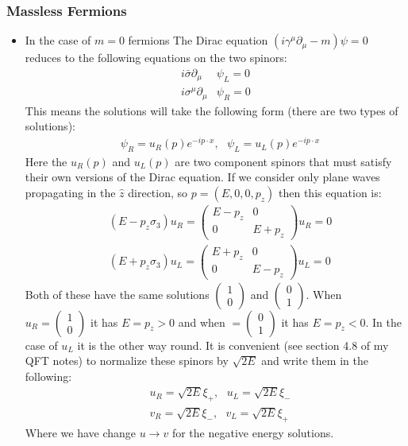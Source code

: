\documentclass[11pt]{article}
\numberwithin{equation}{section}
\begin{document}
\subsubsection{Massless Fermions} %
\label{ssub:massless_fermions}
\begin{itemize}
    \item In the case of $m=0$ fermions The Dirac equation $(i\gamma^{\mu}\partial_{\mu}-m)\psi = 0$ reduces to the following equations on the two spinors:
    \begin{align*}
         i\bar{\sigma}\partial_{\mu}&\psi_{L} = 0 \\
      i\sigma^{\mu}\partial_{\mu}& \psi_{R} =0 
    \end{align*}
    This means the solutions will take the following form (there are two types of solutions):
    \begin{align}
    \label{spinor_ansatz}
        &\psi_{R} = u_{R}(p)e^{-ip \cdot x}, ~~~ \psi_{L} = u_{L}(p)e^{-ip \cdot x}
    \end{align}
    Here the $u_R(p)$ and $u_L(p)$  are two component spinors that must satisfy their own versions of the Dirac equation. If we consider only plane waves propagating in the $\hat{z}$ direction, so $p = (E,0,0,p_z)$ then this equation is:
    \begin{align*}
         & (E-p_z\sigma_3)u_R = \begin{pmatrix}
             E-p_z & 0  \\
             0 & E+ p_z
         \end{pmatrix}u_R = 0  \\
         & (E+p_z\sigma_3)u_L = \begin{pmatrix}
             E+p_z & 0  \\
             0 & E- p_z
         \end{pmatrix}u_L = 0  
     \end{align*} 
     Both of these have the same solutions $\begin{pmatrix}
         1 \\ 0
     \end{pmatrix}$ and $\begin{pmatrix}
         0 \\ 1
     \end{pmatrix}$. When $u_R = \begin{pmatrix}
         1 \\ 0
     \end{pmatrix}$ it has $E = p_z >0$ and when $ = \begin{pmatrix}
         0 \\ 1
     \end{pmatrix}$ it has $E = p_z<0$. In the case of $u_L$ it is the other way round. It is convenient (see section 4.8 of my QFT notes) to normalize these spinors by $\sqrt{2E}$ and write them in the following:
     \begin{align*}
          & u_R = \sqrt{2E}\xi_+, ~~~u_L = \sqrt{2E}\xi_- \\
          & v_R = \sqrt{2E}\xi_-, ~~~v_L = \sqrt{2E}\xi_+
      \end{align*}    
      Where we have change $u \rightarrow v$ for the negative energy solutions. 


\end{itemize}
\end{document}
